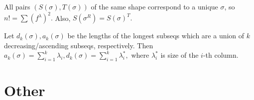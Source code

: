 All pairs $(S(\sigma),T(\sigma))$ of the same shape correspond to a unique $\sigma$, so
$n!=\sum (f^{\lambda})^2.$ Also, $S(\sigma^R)=S(\sigma)^T.$

Let $d_k(\sigma),a_k(\sigma)$ be the lengths of the longest subseqs which are a union of $k$ decreasing/ascending subseqs, respectively. Then $a_k(\sigma)=\sum_{i=1}^k\lambda_i, d_k(\sigma)=\sum_{i=1}^k\lambda^*_i,$ where $\lambda^*_i$ is size of the $i$-th column. 



\section{Other}
